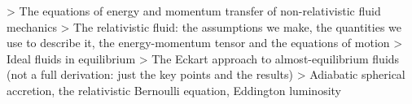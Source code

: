 \documentclass[main.tex]{subfiles}
\begin{document}
> The equations of energy and momentum transfer of non-relativistic fluid mechanics
> The relativistic fluid: the assumptions we make, the quantities we use to describe it, the energy-momentum tensor and the equations of motion
> Ideal fluids in equilibrium
> The Eckart approach to almost-equilibrium fluids (not a full derivation: just the key points and the results)
> Adiabatic spherical accretion, the relativistic Bernoulli equation, Eddington luminosity
\end{document}
